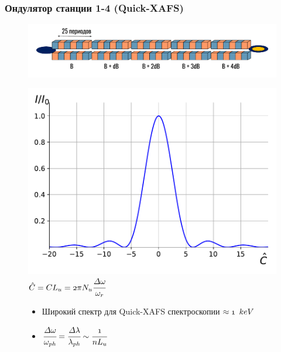 \documentclass[14pt, hyperref = {colorlinks}]{beamer}
\begin{document}
\small
\begin{frame}
\frametitle{Ондулятор станции 1-4 (Quick-XAFS)}\label{t1}
\vspace{-10pt}
\begin{figure}[h]
	\raggedright{\includegraphics[width=0.99\linewidth]{pic/und.pdf}}
\end{figure}
\vspace{-25pt}
\begin{figure}[h]
	\begin{minipage}[h]{0.49\linewidth}
		\includegraphics[width=0.99\linewidth]{pic/spec_C.pdf}\\
		\tiny{$\mathnormal{\hat{C} = CL_u = 2\pi N_u\cfrac{\Delta\omega}{\omega_r}}$}
	\end{minipage}	
	\begin{minipage}[h]{0.49\linewidth}
		\begin{itemize}
			\item {Широкий спектр для Quick-XAFS  спектроскопии $\mathnormal{\approx 1}$ $\mathnormal{keV}$}
			\item {$\mathnormal{\cfrac{\Delta \omega}{\omega_{ph}} = \cfrac{\Delta \lambda}{\lambda_{ph}} \sim \cfrac{1}{nL_u}}$}
		\end{itemize}
	\end{minipage}
\end{figure}

\end{frame}
\end{document}
